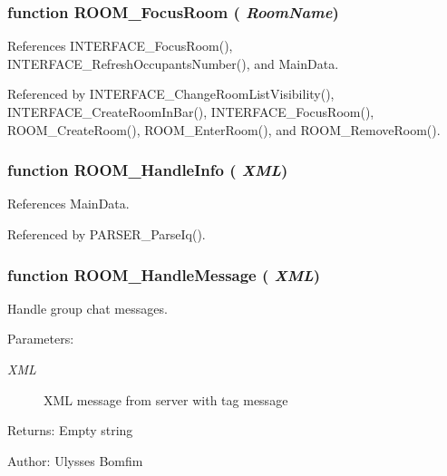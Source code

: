 \subsubsection[ROOM\_\-FocusRoom]{\setlength{\rightskip}{0pt plus 5cm}function ROOM\_\-FocusRoom ( {\em RoomName})}\label{room_2room_8js_6710c024c97239b27d3f4062572293df}




References INTERFACE\_\-FocusRoom(), INTERFACE\_\-RefreshOccupantsNumber(), and MainData.

Referenced by INTERFACE\_\-ChangeRoomListVisibility(), INTERFACE\_\-CreateRoomInBar(), INTERFACE\_\-FocusRoom(), ROOM\_\-CreateRoom(), ROOM\_\-EnterRoom(), and ROOM\_\-RemoveRoom().
\subsubsection[ROOM\_\-HandleInfo]{\setlength{\rightskip}{0pt plus 5cm}function ROOM\_\-HandleInfo ( {\em XML})}\label{room_2room_8js_b808dbbcc855d292d50a67bbdbeb5f8d}




References MainData.

Referenced by PARSER\_\-ParseIq().
\subsubsection[ROOM\_\-HandleMessage]{\setlength{\rightskip}{0pt plus 5cm}function ROOM\_\-HandleMessage ( {\em XML})}\label{room_2room_8js_b8e44c24ddafeaba9d1828af2e1ac279}


Handle group chat messages. 

\begin{Desc}
\item[Parameters:]
\begin{description}
\item[{\em XML}]XML message from server with tag message \end{description}
\end{Desc}
\begin{Desc}
\item[Returns:]Empty string \end{Desc}
\begin{Desc}
\item[Author:]Ulysses Bomfim \end{Desc}


